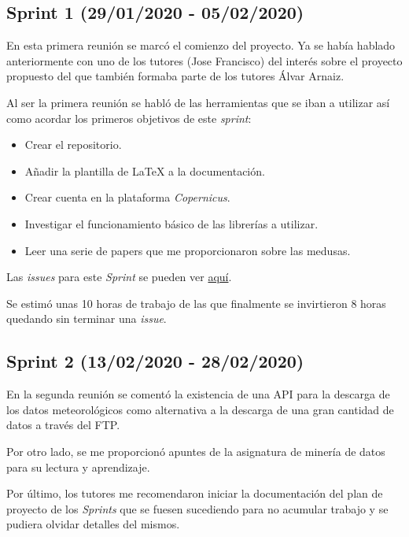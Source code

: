 \subsection{Sprint 1 (29/01/2020 - 05/02/2020)}\label{Sprint-1}
En esta primera reunión se marcó el comienzo del proyecto. Ya se había hablado anteriormente con uno de los tutores (Jose Francisco) del interés sobre el proyecto propuesto del que también formaba parte de los tutores Álvar Arnaiz.

Al ser la primera reunión se habló de las herramientas que se iban a utilizar así como acordar los primeros objetivos de este \emph{sprint}:

\begin{itemize}
\item Crear el repositorio.
\item Añadir la plantilla de \LaTeX{} a la documentación.
\item Crear cuenta en la plataforma \emph{Copernicus}.
\item Investigar el funcionamiento básico de las librerías a utilizar.
\item Leer una serie de papers que me proporcionaron sobre las medusas.
\end{itemize}

Las \emph{issues} para este \emph{Sprint} se pueden ver \href{https://github.com/psnti/TFG-Pablo-Santidrian-Tudanca/milestone/1}{aquí}.

Se estimó unas 10 horas de trabajo de las que finalmente se invirtieron 8 horas quedando sin terminar una \emph{issue}.


\subsection{Sprint 2 (13/02/2020 - 28/02/2020)}\label{Sprint-2}

En la segunda reunión se comentó la existencia de una API para la descarga de los datos meteorológicos como alternativa a la descarga de una gran cantidad de datos a través del FTP.

Por otro lado, se me proporcionó apuntes de la asignatura de minería de datos para su lectura y aprendizaje.

Por último, los tutores me recomendaron iniciar la documentación del plan de proyecto de los \emph{Sprints} que se fuesen sucediendo para no acumular trabajo y se pudiera olvidar detalles del mismos.

